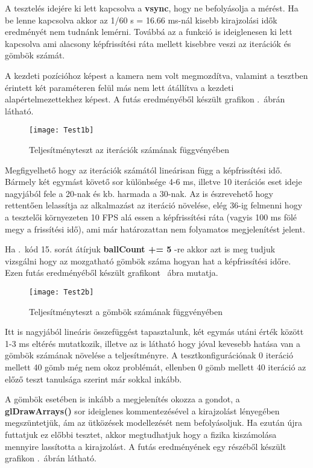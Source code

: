 A tesztelés idejére ki lett kapcsolva a \textbf{vsync}, hogy ne befolyásolja a mérést. Ha be lenne kapcsolva akkor az 1/60 s = 16.66 ms-nál kisebb kirajzolási idők eredményét nem tudnánk lemérni. Továbbá az a funkció is ideiglenesen ki lett kapcsolva ami alacsony képfrissítési ráta mellett kisebbre veszi az iterációk és gömbök számát.

A kezdeti pozícióhoz képest a kamera nem volt megmozdítva, valamint a tesztben érintett két paraméteren felül más nem lett átállítva a kezdeti alapértelmezettekhez képest. A futás eredményéből készült grafikon .~ábrán látható.

\begin{figure}[H]
	\centering
	\texttt{[image: Test1b]}
	\caption{Teljesítményteszt az iterációk számának függvényében}
	\label{fig:Test1}
\end{figure}


Megfigyelhető hogy az iterációk számától lineárisan függ a képfrissítési idő. Bármely két egymást követő sor különbsége 4-6 ms, illetve 10 iterációs eset ideje nagyjából fele a 20-nak és kb. harmada a 30-nak. Az is észrevehető hogy rettentően lelassítja az alkalmazást az iteráció növelése, elég 36-ig felmenni hogy a tesztelői környezeten 10 FPS alá essen a képfrissítési ráta (vagyis 100 ms fölé megy a frissítési idő), ami már határozattan nem folyamatos megjelenítést jelent.

Ha .~kód 15. sorát átírjuk \textbf{ballCount += 5} -re akkor azt is meg tudjuk vizsgálni hogy az mozgatható gömbök száma hogyan hat a képfrissítési időre. Ezen futás eredményéből készült grafikont ~ábra mutatja.

\begin{figure}[H]
	\centering
	\texttt{[image: Test2b]}
	\caption{Teljesítményteszt a gömbök számának függvényében}
	\label{fig:Test2}
\end{figure}

Itt is nagyjából lineáris összefüggést tapasztalunk, két egymás utáni érték között 1-3 ms eltérés mutatkozik, illetve az is látható hogy jóval kevesebb hatása van a gömbök számának növelése a teljesítményre. A tesztkonfigurációnak 0 iteráció mellett 40 gömb még nem okoz problémát, ellenben 0 gömb mellett 40 iteráció az előző teszt tanulsága szerint már sokkal inkább.

A gömbök esetében is inkább a megjelenítés okozza a gondot, a \textbf{glDrawArrays()} sor ideiglenes kommentezésével a kirajzolást lényegében megszüntetjük, ám az ütközések modellezését nem befolyásoljuk. Ha ezután újra futtatjuk ez előbbi tesztet, akkor megtudhatjuk hogy a fizika kiszámolása mennyire lassította a kirajzolást. A futás eredményének egy részéből készült grafikon .~ábrán látható. 

